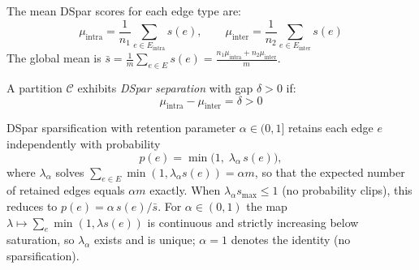 \begin{definition}
The mean DSpar scores for each edge type are:
\begin{equation}
\mu_{\text{intra}} = \frac{1}{n_1} \sum_{e \in E_{\text{intra}}} s(e), \qquad
\mu_{\text{inter}} = \frac{1}{n_2} \sum_{e \in E_{\text{inter}}} s(e)
\end{equation}
The global mean is $\bar{s} = \frac{1}{m}\sum_{e \in E} s(e) = \frac{n_1 \mu_{\text{intra}} + n_2 \mu_{\text{inter}}}{m}$.
\end{definition}

\begin{definition}
A partition $\mathcal{C}$ exhibits \emph{DSpar separation} with gap $\delta > 0$ if:
\begin{equation}
\mu_{\text{intra}} - \mu_{\text{inter}} = \delta > 0
\end{equation}
\end{definition}

\begin{definition}
\label{def:calibrated}
DSpar sparsification with retention parameter $\alpha \in (0,1]$ retains each edge $e$ independently with probability
\begin{equation}
p(e) = \min\bigl(1,\; \lambda_\alpha\, s(e)\bigr),
\end{equation}
where $\lambda_\alpha$ solves $\sum_{e \in E} \min(1, \lambda_\alpha s(e)) = \alpha m$, so that the expected number of retained edges equals $\alpha m$ exactly. When $\lambda_\alpha s_{\max} \le 1$ (no probability clips), this reduces to $p(e) = \alpha\, s(e)/\bar{s}$. For $\alpha \in (0,1)$ the map $\lambda \mapsto \sum_e \min(1, \lambda s(e))$ is continuous and strictly increasing below saturation, so $\lambda_\alpha$ exists and is unique; $\alpha = 1$ denotes the identity (no sparsification).
\end{definition}

